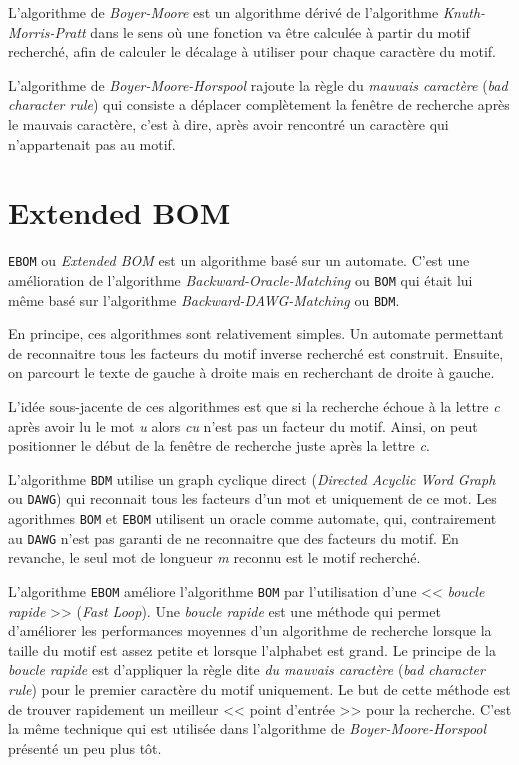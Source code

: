 \documentclass[a4paper,11pt]{article}
\begin{document}
L'algorithme de \emph{Boyer-Moore} est un algorithme dérivé de l'algorithme \emph{Knuth-Morris-Pratt} dans le sens où une fonction va être calculée à partir du motif recherché, afin de calculer le décalage à utiliser pour chaque caractère du motif. 

L'algorithme de \emph{Boyer-Moore-Horspool} rajoute la règle du \emph{mauvais caractère} (\emph{bad character rule}) qui consiste a déplacer complètement la fenêtre de recherche après le mauvais caractère, c'est à dire, après avoir rencontré un caractère qui n'appartenait pas au motif.

\section{Extended BOM}

\texttt{EBOM} ou \emph{Extended BOM} est un algorithme basé sur un automate. C'est une amélioration de l'algorithme \emph{Backward-Oracle-Matching} ou \texttt{BOM} qui était lui même basé sur l'algorithme \emph{Backward-DAWG-Matching} ou \texttt{BDM}.

En principe, ces algorithmes sont relativement simples. Un automate permettant de reconnaitre tous les facteurs du motif inverse recherché est construit. Ensuite, on parcourt le texte de gauche à droite mais en recherchant de droite à gauche.

L'idée sous-jacente de ces algorithmes est que si la recherche échoue à la lettre \emph{c} après avoir lu le mot \emph{u} alors \emph{cu} n'est pas un facteur du motif. Ainsi, on peut positionner le début de la fenêtre de recherche juste après la lettre \emph{c}.

L'algorithme \texttt{BDM} utilise un graph cyclique direct (\emph{Directed Acyclic Word Graph} ou \texttt{DAWG}) qui reconnait tous les facteurs d'un mot et uniquement de ce mot. Les agorithmes \texttt{BOM} et \texttt{EBOM} utilisent un oracle comme automate, qui, contrairement au \texttt{DAWG} n'est pas garanti de ne reconnaitre que des facteurs du motif. En revanche, le seul mot de longueur \emph{m} reconnu est le motif recherché.

L'algorithme \texttt{EBOM} améliore l'algorithme \texttt{BOM} par l'utilisation d'une << \emph{boucle rapide} >> (\emph{Fast Loop}). Une \emph{boucle rapide} est une méthode qui permet d'améliorer les performances moyennes d'un algorithme de recherche lorsque la taille du motif est assez petite et lorsque l'alphabet est grand. Le principe de la \emph{boucle rapide} est d'appliquer la règle dite \emph{du mauvais caractère} (\emph{bad character rule}) pour le premier caractère du motif uniquement. Le but de cette méthode est de trouver rapidement un meilleur << point d'entrée >> pour la recherche. C'est la même technique qui est utilisée dans l'algorithme de \emph{Boyer-Moore-Horspool} présenté un peu plus tôt.
\end{document}
